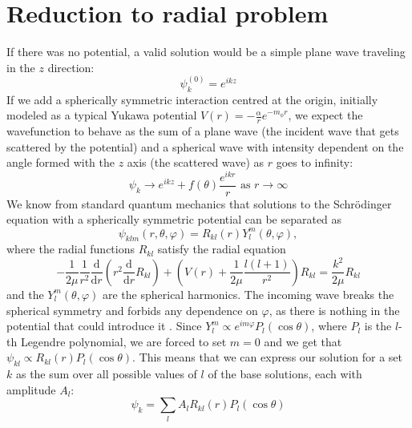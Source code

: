 \section{Reduction to radial problem}

If there was no potential, a valid solution would be a simple plane wave traveling in the \(z\) direction:
\begin{equation}
	\psi _k^{(0)} = e^{ikz} 
\end{equation}
If we add a spherically symmetric interaction centred at the origin, initially modeled as a typical Yukawa potential \(V(r) =- \frac{\alpha}{r} e^{-m_{\phi } r }\), we expect the wavefunction to behave as the sum of a plane wave (the incident wave that gets scattered by the potential) and a spherical wave with intensity dependent on the angle formed with the \(z\) axis (the scattered wave) as \(r\) goes to infinity:
\begin{equation}\label{eq:asymptotic}
	\psi _k \to e^{ikz} + f(\theta ) \frac{e^{ikr} }{r} \text{ as } r\to \infty 
\end{equation}
We know from standard quantum mechanics that solutions to the Schrödinger equation with a spherically symmetric potential can be separated as
\begin{equation}
	\psi_{klm} (r,\theta,\varphi) = R_{kl} (r) Y_l^m(\theta , \varphi ),
\end{equation}
where the radial functions \(R_{kl} \) satisfy the radial equation
\begin{equation}\label{eq:radial}
	-\frac{1}{2\mu } \frac{1}{r^2} \frac{\mathrm{d}}{\mathrm{d}r}\left(r^2 \frac{\mathrm{d}}{\mathrm{d}r}  R_{kl}\right) + \left(V(r)+ \frac{1}{2\mu }\frac{l(l+1)}{r^2}\right)R_{kl} = \frac{k^2}{2\mu }R_{kl} 
\end{equation}
and the \(Y_l^m(\theta , \varphi )\) are the spherical harmonics. The incoming wave breaks the spherical symmetry and forbids any dependence on \(\varphi \), as there is nothing in the potential that could introduce it \cite{Griffiths}. Since \(Y_l^m \propto e^{im \varphi} P_l(\cos \theta ) \), where \(P_l\) is the \(l\)-th Legendre polynomial, we are forced to set \(m=0\) and we get that \(\psi_{kl} \propto R_{kl}(r) P_l (\cos \theta )\). This means that we can express our solution for a set \(k\) as the sum over all possible values of \(l\) of the base solutions, each with amplitude \(A_l\):
\begin{equation}\label{eq:sum}
	\psi _k = \sum_{l} A_l R_{kl} (r) P_l (\cos \theta )
\end{equation}

